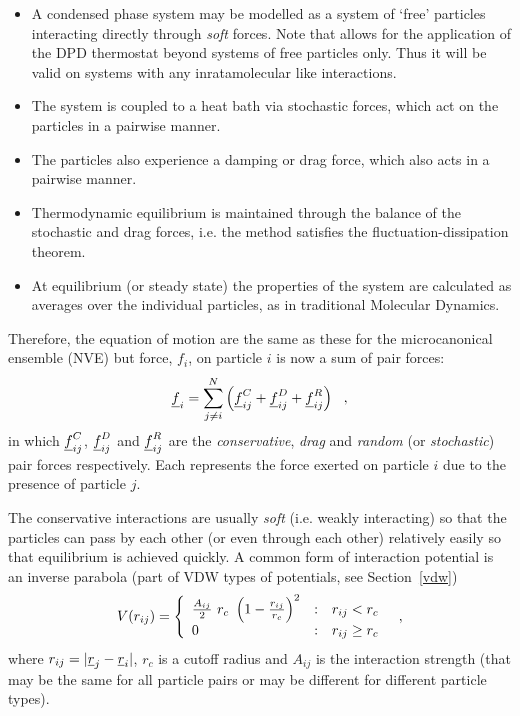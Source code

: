 \begin{itemize}
\item A condensed phase system may be modelled as a system of `free' particles
interacting directly through \emph{soft} forces.  Note that \D allows for the
application of the DPD thermostat beyond systems of free particles only.  Thus
it will be valid on systems with any inratamolecular like interactions.
\item The system is coupled to a heat bath via stochastic forces, which act on
the particles in a pairwise manner.
\item The particles also experience a damping or drag force, which also acts
in a pairwise manner.
\item Thermodynamic equilibrium is maintained through the balance of the stochastic
and drag forces, i.e. the method satisfies the fluctuation-dissipation theorem.
\item At equilibrium (or steady state) the properties of the system are calculated
as averages over the individual particles, as in traditional Molecular Dynamics.
\end{itemize}

Therefore, the equation of motion are the same as these for the microcanonical
ensemble (NVE) but force, $f_{i}$, on particle $i$ is now a sum of pair forces:
\begin{equation}
\mbox{$\underline{f}$}_i = \sum_{j \neq i}^N \left( \mbox{$\underline{f}$}_{ij}^{C} + \mbox{$\underline{f}$}_{ij}^{D} + \mbox{$\underline{f}$}_{ij}^{R} \right)~~, \label{DPD}
\end{equation}
in which $\mbox{$\underline{f}$}_{ij}^{C}$, $\mbox{$\underline{f}$}_{ij}^{D}$ and $\mbox{$\underline{f}$}_{ij}^{R}$ are
the \emph{conservative}, \emph{drag} and \emph{random} (or \emph{stochastic})
pair forces respectively.  Each represents the force exerted on particle $i$
due to the presence of particle $j$.

The conservative interactions are usually \emph{soft} (i.e. weakly interacting)
so that the particles can pass by each other (or even through each other) relatively
easily so that equilibrium is achieved quickly.  A common form of interaction
potential is an inverse parabola (part of VDW types of potentials, see Section~\ref{vdw})
\begin{equation}
V(r_{ij}) = \left\{ \begin{array} {l@{\quad:\quad}l}
\frac{A_{ij}}{2}~r_{c}~\left(1-\frac{r_{ij}}{r_{c}}\right)^{2} & r_{ij} < r_{c} \\
0 & r_{ij} \ge r_{c} \end{array} \right.~~, \label{DPDU}
\end{equation}
where $r_{ij} = |\mbox{$\underline{r}$}_{j}-\mbox{$\underline{r}$}_{i}|$, $r_{c}$ is a cutoff radius and $A_{ij}$
is the interaction strength (that may be the same for all particle pairs or may be
different for different particle types).

